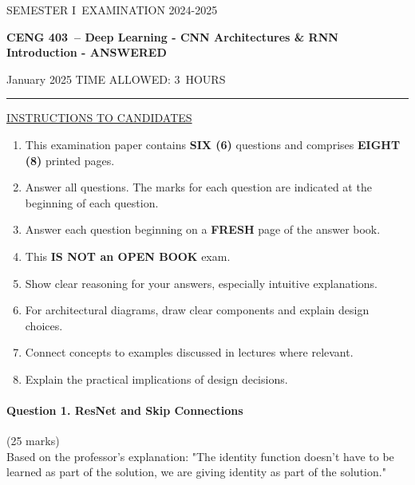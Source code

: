 \documentclass[12pt]{article}
\newcommand{\masunitnumber}{CENG 403}
\newcommand{\examdate}{January 2025}
\newcommand{\academicyear}{2024-2025}
\newcommand{\semester}{I}
\newcommand{\coursename}{Deep Learning - CNN Architectures \& RNN Introduction - ANSWERED}
\newcommand{\numberofhours}{3}
\begin{document}
\setlength{\headsep}{5truemm}
\setlength{\headheight}{14.5truemm}
\setlength{\voffset}{-0.45truein}
\renewcommand{\headrulewidth}{0.0pt}
\begin{center}
SEMESTER \semester\ EXAMINATION \academicyear
\end{center}
\begin{center}
{\bf \masunitnumber\ -- \coursename}
\end{center}
\vspace{20truemm}
\noindent \examdate\hspace{45truemm} TIME ALLOWED: \numberofhours\ HOURS
\vspace{19truemm}
\hrule
\vspace{19truemm}
\noindent\underline{INSTRUCTIONS TO CANDIDATES}
\vspace{8truemm}
\begin{enumerate}
\item This examination paper contains {\bf SIX (6)} questions and comprises 
{\bf EIGHT (8)} printed pages.
\item Answer all questions. 
The marks for each question are indicated at the beginning of each question.
\item Answer each question beginning on a {\bf FRESH} page of the answer book.
\item This {\bf IS NOT an OPEN BOOK} exam.
\item Show clear reasoning for your answers, especially intuitive explanations.
\item For architectural diagrams, draw clear components and explain design choices.
\item Connect concepts to examples discussed in lectures where relevant.
\item Explain the practical implications of design decisions.
\end{enumerate}
\newpage
\lhead{}
\rhead{\masunitnumber}
\chead{}
\lfoot{}
\cfoot{\thepage}
\rfoot{}
\setlength{\footskip}{45pt}

\paragraph{Question 1. ResNet and Skip Connections}{\hfill (25 marks)}\\
Based on the professor's explanation: "The identity function doesn't have to be learned as part of the solution, we are giving identity as part of the solution."
\end{document}
